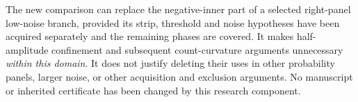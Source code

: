 \documentclass[11pt,a4paper]{article}
\begin{document}
The new comparison can replace the negative-inner part of a selected
right-panel low-noise branch, provided its strip, threshold and noise
hypotheses have been acquired separately and the remaining phases are
covered. It makes half-amplitude confinement and subsequent count-curvature
arguments unnecessary \emph{within this domain}. It does not justify
deleting their uses in other probability panels, larger noise, or other
acquisition and exclusion arguments. No manuscript or inherited certificate
has been changed by this research component.
\end{document}
